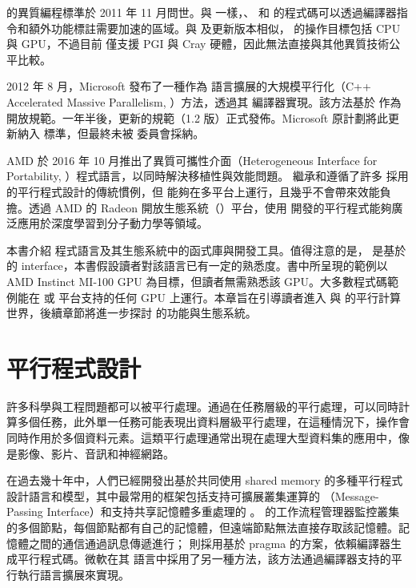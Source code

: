  的異質編程標準於 2011 年 11 月問世。與  一樣，、 和  的程式碼可以透過編譯器指令和額外功能標註需要加速的區域。與  及更新版本相似， 的操作目標包括 CPU 與 GPU，不過目前  僅支援 PGI 與 Cray 硬體，因此無法直接與其他異質技術公平比較。

2012 年 8 月，Microsoft 發布了一種作為  語言擴展的大規模平行化（C++ Accelerated Massive Parallelism, ）方法，透過其  編譯器實現。該方法基於  作為開放規範。一年半後，更新的規範（1.2 版）正式發佈。Microsoft 原計劃將此更新納入  標準，但最終未被  委員會採納。

AMD 於 2016 年 10 月推出了異質可攜性介面（Heterogeneous Interface for Portability, ）程式語言，以同時解決移植性與效能問題。 繼承和遵循了許多  採用的平行程式設計的傳統慣例，但  能夠在多平台上運行，且幾乎不會帶來效能負擔。透過 AMD 的 Radeon 開放生態系統（）平台，使用  開發的平行程式能夠廣泛應用於深度學習到分子動力學等領域。

本書介紹  程式語言及其生態系統中的函式庫與開發工具。值得注意的是， 是基於  的 interface，本書假設讀者對該語言已有一定的熟悉度。書中所呈現的範例以 AMD Instinct MI-100 GPU 為目標，但讀者無需熟悉該 GPU。大多數程式碼範例能在  或  平台支持的任何 GPU 上運行。本章旨在引導讀者進入  與  的平行計算世界，後續章節將進一步探討  的功能與生態系統。

\section{平行程式設計}
許多科學與工程問題都可以被平行處理。通過在任務層級的平行處理，可以同時計算多個任務，此外單一任務可能表現出資料層級平行處理，在這種情況下，操作會同時作用於多個資料元素。這類平行處理通常出現在處理大型資料集的應用中，像是影像、影片、音訊和神經網路。

在過去幾十年中，人們已經開發出基於共同使用 shared memory 的多種平行程式設計語言和模型，其中最常用的框架包括支持可擴展叢集運算的 （Message-Passing Interface）和支持共享記憶體多重處理的 。 的工作流程管理器監控叢集的多個節點，每個節點都有自己的記憶體，但遠端節點無法直接存取該記憶體。記憶體之間的通信通過訊息傳遞進行； 則採用基於 pragma 的方案，依賴編譯器生成平行程式碼。微軟在其   語言中採用了另一種方法，該方法通過編譯器支持的平行執行語言擴展來實現。

